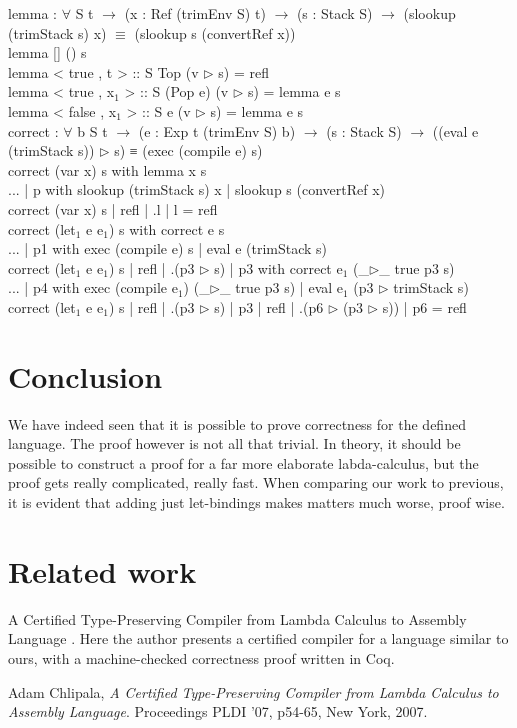 \documentclass[paper=a4, fontsize=11pt]{scrartcl} %
\numberwithin{equation}{section} %
\numberwithin{figure}{section} %
\numberwithin{table}{section} %
\begin{document}
lemma : $\forall$ {S t} $\rightarrow$ (x : Ref (trimEnv S) t) $\rightarrow$ (s : Stack S) $\rightarrow$ (slookup (trimStack s) x) $\equiv$ (slookup s (convertRef x))\\
lemma {[]} () s\\
lemma {< true , t > :: S} Top (v $\rhd$ s) = refl\\
lemma {< true , x$_1$ > :: S} (Pop e) (v $\rhd$ s) = lemma e s\\
lemma {< false , x$_1$ > :: S} e (v $\rhd$ s) = lemma e s\\

correct : $\forall$ {b S t} $\rightarrow$ (e : Exp t (trimEnv S) b) $\rightarrow$ (s : Stack S) $\rightarrow$ ((eval e (trimStack s)) $\rhd$ s) ≡ (exec (compile e) s)\\
correct (var x) s with lemma x s\\
... | p with slookup (trimStack s) x | slookup s (convertRef x) \\
correct (var x) s | refl | .l | l = refl\\
correct (let$_1$ e e$_1$) s with correct e s\\
... | p1 with exec (compile e) s | eval e (trimStack s)\\
correct (let$_1$ e e$_1$) s | refl | .(p3 $\rhd$ s) | p3 with correct e$_1$ (\_$\rhd$\_ {true} p3 s)\\
... | p4 with exec (compile e$_1$) (\_$\rhd$\_ {true} p3 s) | eval e$_1$ (p3 $\rhd$ trimStack s)\\
correct (let$_1$ e e$_1$) s | refl | .(p3 $\rhd$ s) | p3 | refl | .(p6 $\rhd$ (p3 $\rhd$ s)) | p6 = refl\\
\normalfont
\section{Conclusion}
We have indeed seen that it is possible to prove correctness for the defined language. The proof however is not all that trivial. In theory, it should be possible to construct a proof for a far more elaborate labda-calculus, but the proof gets really complicated, really fast. When comparing our work to previous, it is evident that adding just let-bindings makes matters much worse, proof wise.
\section{Related work} %
A Certified Type-Preserving Compiler from Lambda Calculus to
Assembly Language \cite{Chlipala}. Here the author presents a certified compiler for a language similar to ours, with a machine-checked correctness proof written in Coq.

\begin{thebibliography}{9}
	Adam Chlipala,
  	\emph{A Certified Type-Preserving Compiler from Lambda Calculus to
Assembly Language}.
  	Proceedings PLDI '07, p54-65, New York, 2007.
	
\end{thebibliography}
\end{document}
